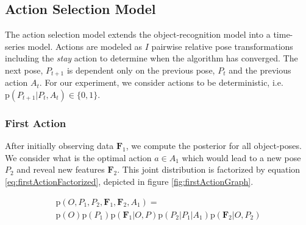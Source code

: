 \documentclass[conference]{IEEEtran}
\newcommand{\prob}[1]{\text{p}(#1)} %
\newcommand{\set}[1]{\mathbf{#1}} %
\newcommand{\italic}[1]{\textit{#1}} %
\begin{document}


    \subsection{Action Selection Model}
        The action selection model extends the object-recognition model into a time-series model. Actions are modeled as $I$ pairwise relative pose transformations including the \italic{stay} action to determine when the algorithm has converged. The next pose, $P_{t+1}$ is dependent only on the previous pose, $P_t$ and the previous action $A_t$. For our experiment, we consider actions to be deterministic, i.e. $\prob{P_{t+1}|P_t,A_t} \in \{ 0 , 1 \}$.

    \subsubsection{First Action}
        After initially observing data $\set{F}_1$, we compute the posterior for all object-poses. We consider what is the optimal action $a \in A_1$ which would lead to a new pose $P_2$ and reveal new features $\set{F}_2$. This joint distribution is factorized by equation \ref{eq:firstActionFactorized}, depicted in figure \ref{fig:firstActionGraph}.

        \begin{multline}
            \label{eq:firstActionFactorized}
            \prob{O,P_1,P_2,\set{F}_1, \set{F}_2, A_1} = \\ \prob{O}\prob{P_1}\prob{\set{F}_1|O,P}\prob{P_2|P_1|A_1}\prob{\set{F}_2|O,P_2}
        \end{multline}
\end{document}
